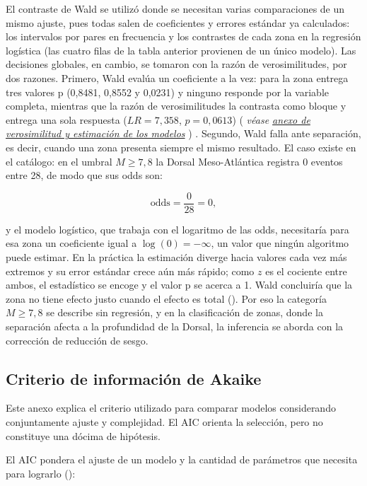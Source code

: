\documentclass[
  spanish,
  letterpaper,
  DIV=11,
  numbers=noendperiod]{scrartcl}
\newcommand{\asesoriaParenRef}[1]{%
  \textnormal{\textcolor{asesoriaTextColor}{(}}%
  {\hypersetup{linkcolor=asesoriaLinkColor,urlcolor=asesoriaLinkColor,citecolor=asesoriaLinkColor}\textcolor{asesoriaTextColor}{\emph{#1}}}%
  \textnormal{\textcolor{asesoriaTextColor}{)}}%
}
\begin{document}
El contraste de Wald se utilizó donde se necesitan varias comparaciones
de un mismo ajuste, pues todas salen de coeficientes y errores estándar
ya calculados: los intervalos por pares en frecuencia y los contrastes
de cada zona en la regresión logística (las cuatro filas de la tabla
anterior provienen de un único modelo). Las decisiones globales, en
cambio, se tomaron con la razón de verosimilitudes, por dos razones.
Primero, Wald evalúa un coeficiente a la vez: para la zona entrega tres
valores p (0,8481, 0,8552 y 0,0231) y ninguno responde por la variable
completa, mientras que la razón de verosimilitudes la contrasta como
bloque y entrega una sola respuesta (\(LR=7{,}358\), \(p=0{,}0613\))
\asesoriaParenRef{véase \hyperref[sec-anexo-verosimilitud]{anexo de verosimilitud y estimación de los modelos}}.
Segundo, Wald falla ante separación, es decir, cuando una zona presenta
siempre el mismo resultado. El caso existe en el catálogo: en el umbral
\(M \geq 7{,}8\) la Dorsal Meso-Atlántica registra 0 eventos entre 28,
de modo que sus odds son:

\[
\text{odds}=\frac{0}{28}=0,
\]

y el modelo logístico, que trabaja con el logaritmo de las odds,
necesitaría para esa zona un coeficiente igual a \(\log(0)=-\infty\), un
valor que ningún algoritmo puede estimar. En la práctica la estimación
diverge hacia valores cada vez más extremos y su error estándar crece
aún más rápido; como \(z\) es el cociente entre ambos, el estadístico se
encoge y el valor p se acerca a 1. Wald concluiría que la zona no tiene
efecto justo cuando el efecto es total
(). Por eso la
categoría \(M \geq 7{,}8\) se describe sin regresión, y en la
clasificación de zonas, donde la separación afecta a la profundidad de
la Dorsal, la inferencia se aborda con la corrección de reducción de
sesgo.

\subsection{Criterio de información de Akaike}\label{sec-anexo-aic}

Este anexo explica el criterio utilizado para comparar modelos
considerando conjuntamente ajuste y complejidad. El AIC orienta la
selección, pero no constituye una dócima de hipótesis.

El AIC pondera el ajuste de un modelo y la cantidad de parámetros que
necesita para lograrlo ():
\end{document}
